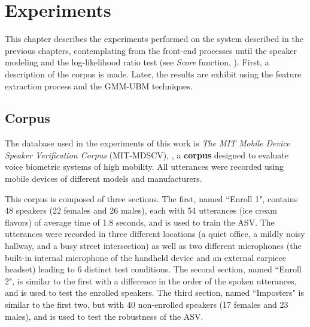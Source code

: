 \chapter{Experiments}
\label{ch:experiments}

This chapter describes the experiments performed on the system described in the previous chapters, contemplating from the front-end processes until the speaker modeling and the log-likelihood ratio test (see \emph{Score} function, ). First, a description of the corpus is made. Later, the results are exhibit using the feature extraction process and the GMM-UBM techniques.

\section{Corpus}
\label{sec:corpus}

The database used in the experiments of this work is \emph{The MIT Mobile Device Speaker Verification Corpus} (MIT-MDSCV), , a \textbf{corpus} designed to evaluate voice biometric systems of high mobility. All utterances were recorded using mobile devices of different models and manufacturers.

This corpus is composed of three sections. The first, named ``Enroll 1", contains 48 speakers (22 females and 26 males), each with 54 utterances (ice cream flavors) of average time of 1.8 seconds, and is used to train the ASV. The utterances were recorded in three different locations (a quiet office, a mildly noisy hallway, and a busy street intersection) as well as two different microphones (the built-in internal microphone of the handheld device and an external earpiece headset) leading to 6 distinct test conditions. The second section, named ``Enroll 2", is similar to the first with a difference in the order of the spoken utterances, and is used to test the enrolled speakers. The third section, named ``Imposters" is similar to the first two, but with 40 non-enrolled speakers (17 females and 23 males), and is used to test the robustness of the ASV.

